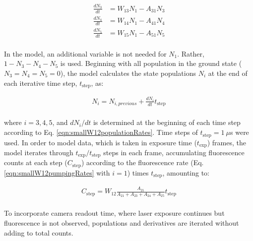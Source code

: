 
\begin{equation}
\begin{aligned}
\frac{dN_3}{dt} &= W_{13}N_{1} - A_{31}N_{3} \\
\frac{dN_4}{dt} &= W_{14}N_{1} - A_{41}N_{4} \\
\frac{dN_5}{dt} &= W_{15}N_{1} - A_{51}N_{5} \\
\end{aligned}
\label{eqn:smallW12populationRates}
\end{equation}

\noindent
In the model, an additional variable is not needed for $N_{1}$.  Rather, $1 - N_{3} - N_{4} - N_{5}$ is used.  Beginning with all population in the ground state ($N_{3} = N_{4} = N_{5} = 0$), the model calculates the state populations $N_{i}$ at the end of each iterative time step, $t_{\text{step}}$, as:

\begin{equation}
\begin{aligned}
N_{i} = N_{i, previous} + \frac{dN_i}{dt}t_{\text{step}} \\
\end{aligned}
\label{eqn:smallW12populations}
\end{equation}

\noindent
where $i = 3,4,5$, and $dN_i/dt$ is determined at the beginning of each time step according to Eq. \ref{eqn:smallW12populationRates}.  Time steps of $t_{\text{step}} = 1~\mu$s were used.  In order to model data, which is taken in exposure time ($t_{\text{exp}}$) frames, the model iterates through $t_{\text{exp}}/t_{\text{step}}$ steps in each frame, accumulating fluorescence counts at each step ($C_{\text{step}}$) according to the fluorescence rate (Eq. \ref{eqn:smallW12pumpingRates} with $i = 1$) times $t_{\text{step}}$, amounting to:

\begin{equation}
\begin{aligned}
C_{\text{step}} = W_{12}\frac{A_{21}}{A_{21} + A_{23} + A_{24} + A_{25}}t_{\text{step}} \\
\end{aligned}
\label{eqn:smallW12counts}
\end{equation}

\noindent
To incorporate camera readout time, where laser exposure continues but fluorescence is not observed, populations and derivatives are iterated without adding to total counts.

